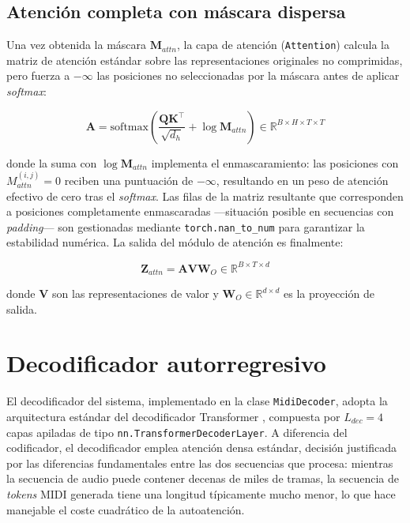 \subsection{Atención completa con máscara dispersa}
\label{subsec:attn_completa_dispersa}

Una vez obtenida la máscara $\mathbf{M}_{attn}$, la capa de atención (\texttt{Attention})
calcula la matriz de atención estándar sobre las representaciones originales no comprimidas,
pero fuerza a $-\infty$ las posiciones no seleccionadas por la máscara antes de aplicar
\textit{softmax}:

\begin{equation}
    \mathbf{A} = \text{softmax}\!\left(\frac{\mathbf{Q}\mathbf{K}^{\top}}{\sqrt{d_h}}
    + \log \mathbf{M}_{attn}\right)
    \in \mathbb{R}^{B \times H \times T \times T}
    \label{eq:attn_dispersa}
\end{equation}

donde la suma con $\log \mathbf{M}_{attn}$ implementa el enmascaramiento: las posiciones
con $M_{attn}^{(i,j)} = 0$ reciben una puntuación de $-\infty$, resultando en un peso de
atención efectivo de cero tras el \textit{softmax}. Las filas de la matriz resultante que
corresponden a posiciones completamente enmascaradas —situación posible en secuencias
con \textit{padding}— son gestionadas mediante \texttt{torch.nan\_to\_num} para
garantizar la estabilidad numérica. La salida del módulo de atención es finalmente:

\begin{equation}
    \mathbf{Z}_{attn} = \mathbf{A} \mathbf{V} \mathbf{W}_O
    \in \mathbb{R}^{B \times T \times d}
    \label{eq:salida_attn}
\end{equation}

donde $\mathbf{V}$ son las representaciones de valor y $\mathbf{W}_O \in \mathbb{R}^{d \times d}$
es la proyección de salida.

\section{Decodificador autorregresivo}
\label{sec:decoder}

El decodificador del sistema, implementado en la clase \texttt{MidiDecoder}, adopta la
arquitectura estándar del decodificador Transformer \cite{vaswani2017attention}, compuesta
por $L_{dec} = 4$ capas apiladas de tipo \texttt{nn.TransformerDecoderLayer}. A diferencia
del codificador, el decodificador emplea atención densa estándar, decisión justificada por
las diferencias fundamentales entre las dos secuencias que procesa: mientras la secuencia
de audio puede contener decenas de miles de tramas, la secuencia de \textit{tokens} MIDI
generada tiene una longitud típicamente mucho menor, lo que hace manejable el coste
cuadrático de la autoatención.


